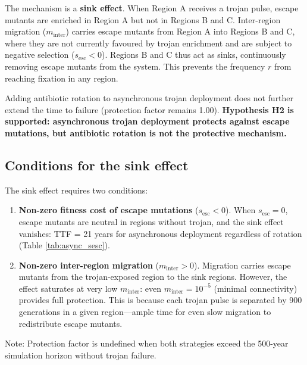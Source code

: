 \documentclass[12pt,a4paper]{article}
\begin{document}
The mechanism is a \textbf{sink effect}. When Region A receives a trojan pulse, escape mutants are enriched in Region A but not in Regions B and C. Inter-region migration ($m_{\text{inter}}$) carries escape mutants from Region A into Regions B and C, where they are not currently favoured by trojan enrichment and are subject to negative selection ($s_{\text{esc}} < 0$). Regions B and C thus act as sinks, continuously removing escape mutants from the system. This prevents the frequency $r$ from reaching fixation in any region.

Adding antibiotic rotation to asynchronous trojan deployment does not further extend the time to failure (protection factor remains 1.00). \textbf{Hypothesis H2 is supported: asynchronous trojan deployment protects against escape mutations, but antibiotic rotation is not the protective mechanism.}

\subsection{Conditions for the sink effect}

The sink effect requires two conditions:

\begin{enumerate}
    \item \textbf{Non-zero fitness cost of escape mutations} ($s_{\text{esc}} < 0$). When $s_{\text{esc}} = 0$, escape mutants are neutral in regions without trojan, and the sink effect vanishes: TTF = 21 years for asynchronous deployment regardless of rotation (Table \ref{tab:async_sesc}).
    \item \textbf{Non-zero inter-region migration} ($m_{\text{inter}} > 0$). Migration carries escape mutants from the trojan-exposed region to the sink regions. However, the effect saturates at very low $m_{\text{inter}}$: even $m_{\text{inter}} = 10^{-5}$ (minimal connectivity) provides full protection. This is because each trojan pulse is separated by 900 generations in a given region---ample time for even slow migration to redistribute escape mutants.
\end{enumerate}

\begin{table}[h]
\centering
\caption{Asynchronous trojan: sensitivity to $s_{\text{esc}}$, $m_{\text{inter}} = 10^{-2}$.}
\label{tab:async_sesc}
\footnotesize{Note: Protection factor is undefined when both strategies exceed the 500-year simulation horizon without trojan failure.}
\end{table}
\end{document}
